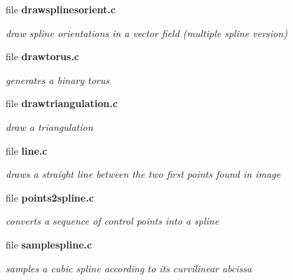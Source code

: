 \begin{CompactItemize}
\item 
file \bf{drawsplinesorient.c}
\begin{CompactList}\small\item\em draw spline orientations in a vector field (multiple spline version) \item\end{CompactList}

\item 
file \bf{drawtorus.c}
\begin{CompactList}\small\item\em generates a binary torus \item\end{CompactList}

\item 
file \bf{drawtriangulation.c}
\begin{CompactList}\small\item\em draw a triangulation \item\end{CompactList}

\item 
file \bf{line.c}
\begin{CompactList}\small\item\em draws a straight line between the two first points found in image \item\end{CompactList}

\item 
file \bf{points2spline.c}
\begin{CompactList}\small\item\em converts a sequence of control points into a spline \item\end{CompactList}

\item 
file \bf{samplespline.c}
\begin{CompactList}\small\item\em samples a cubic spline according to its curvilinear abcissa \item\end{CompactList}

\end{CompactItemize}
